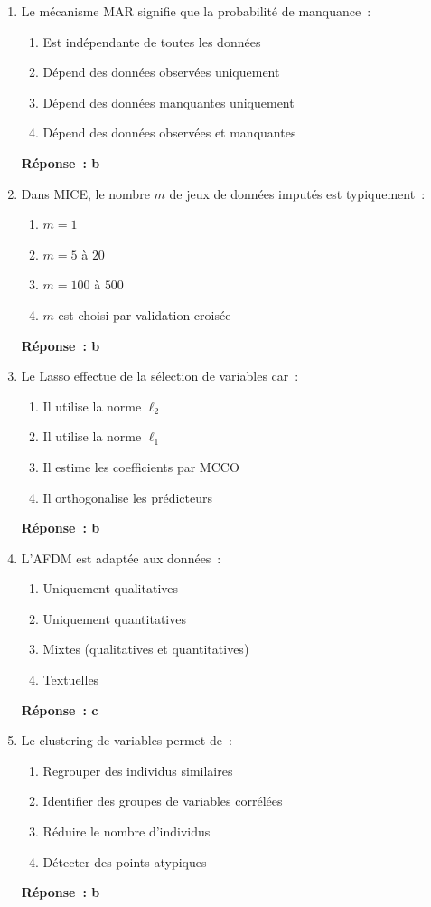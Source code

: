 \documentclass[a4paper,11pt]{article}
\theoremstyle{definition}
\theoremstyle{remark}
\begin{document}
\begin{enumerate}
  \item Le mécanisme MAR signifie que la probabilité de manquance~:
    \begin{enumerate}
      \item Est indépendante de toutes les données
      \item Dépend des données observées uniquement
      \item Dépend des données manquantes uniquement
      \item Dépend des données observées et manquantes
    \end{enumerate}
    \textbf{Réponse~: b}

  \item Dans MICE, le nombre $m$ de jeux de données imputés est
    typiquement~:
    \begin{enumerate}
      \item $m=1$
      \item $m=5$ à $20$
      \item $m=100$ à $500$
      \item $m$ est choisi par validation croisée
    \end{enumerate}
    \textbf{Réponse~: b}

  \item Le Lasso effectue de la sélection de variables car~:
    \begin{enumerate}
      \item Il utilise la norme $\ell_2$
      \item Il utilise la norme $\ell_1$
      \item Il estime les coefficients par MCCO
      \item Il orthogonalise les prédicteurs
    \end{enumerate}
    \textbf{Réponse~: b}

  \item L'AFDM est adaptée aux données~:
    \begin{enumerate}
      \item Uniquement qualitatives
      \item Uniquement quantitatives
      \item Mixtes (qualitatives et quantitatives)
      \item Textuelles
    \end{enumerate}
    \textbf{Réponse~: c}

  \item Le clustering de variables permet de~:
    \begin{enumerate}
      \item Regrouper des individus similaires
      \item Identifier des groupes de variables corrélées
      \item Réduire le nombre d'individus
      \item Détecter des points atypiques
    \end{enumerate}
    \textbf{Réponse~: b}


\end{enumerate}
\end{document}
